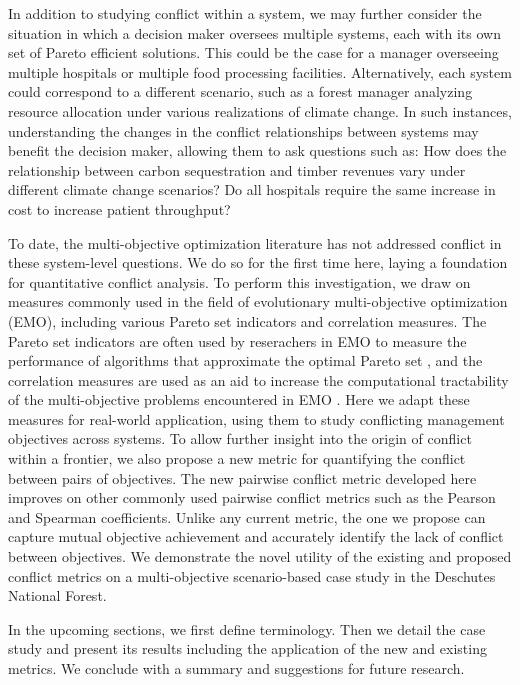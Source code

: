 In addition to studying conflict within a system, we may further consider the situation in which a decision maker oversees multiple systems, each with its own set of Pareto efficient solutions. This could be the case for a manager overseeing multiple hospitals or multiple food processing facilities. Alternatively, each system could correspond to a different scenario, such as a forest manager analyzing resource allocation under various realizations of climate change. In such instances, understanding the changes in the conflict relationships between systems may benefit the decision maker, allowing them to ask questions such as: How does the relationship between carbon sequestration and timber revenues vary under different climate change scenarios? Do all hospitals require the same increase in cost to increase patient throughput?

To date, the multi-objective optimization literature has not addressed conflict in these system-level questions. We do so for the first time here, laying a foundation for quantitative conflict analysis. To perform this investigation, we draw on measures commonly used in the field of evolutionary multi-objective optimization (EMO), including various Pareto set indicators and correlation measures. The Pareto set indicators are often used by reserachers in EMO to measure the performance of algorithms that approximate the optimal Pareto set \cite{zitzler2003performance}, and the correlation measures are used as an aid to increase the computational tractability of the multi-objective problems encountered in EMO \cite{brockhoff2006all}. Here we adapt these measures for real-world application, using them to study conflicting management objectives across systems. To allow further insight into the origin of conflict within a frontier, we also propose a new metric for quantifying the conflict between pairs of objectives. The new pairwise conflict metric developed here improves on other commonly used pairwise conflict metrics such as the Pearson and Spearman coefficients. Unlike any current metric, the one we propose can capture mutual objective achievement and accurately identify the lack of conflict between objectives. We demonstrate the novel utility of the existing and proposed conflict metrics on a multi-objective scenario-based case study in the Deschutes National Forest.

In the upcoming sections, we first define terminology. Then we detail the case study and present its results including the application of the new and existing metrics. We conclude with a summary and suggestions for future research.